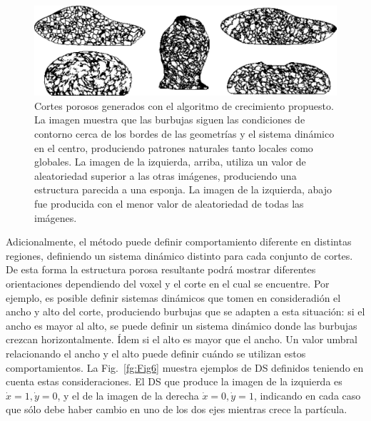 
\begin{figure}
  \centerline{\includegraphics[width=15cm]{figures/Fig5}}
  \caption{Cortes porosos generados con el algoritmo de crecimiento propuesto. La imagen muestra que las burbujas siguen las condiciones de contorno cerca de los bordes de las geometrías y el sistema dinámico en el centro, produciendo patrones naturales tanto locales como globales. La imagen de la izquierda, arriba, utiliza un valor de aleatoriedad superior a las otras imágenes, produciendo una estructura parecida a una esponja. La imagen de la izquierda, abajo fue producida con el menor valor de aleatoriedad de todas las imágenes.}
  \label{fg:Fig5}
\end{figure}

Adicionalmente, el método puede definir comportamiento diferente en distintas regiones, definiendo un sistema dinámico distinto para cada conjunto de cortes.
De esta forma la estructura porosa resultante podrá mostrar diferentes orientaciones dependiendo del voxel y el corte en el cual se encuentre.
Por ejemplo, es posible definir sistemas dinámicos que tomen en consideradión el ancho y alto del corte, produciendo burbujas que se adapten a esta situación: si el ancho es mayor al alto, se puede definir un sistema dinámico donde las burbujas crezcan horizontalmente.
Ídem si el alto es mayor que el ancho.
Un valor umbral relacionando el ancho y el alto puede definir cuándo se utilizan estos comportamientos.
La Fig.~\ref{fg:Fig6} muestra ejemplos de DS definidos teniendo en cuenta estas consideraciones.
El DS que produce la imagen de la izquierda es $\dot{x} = 1, \dot{y} = 0$, y el de la imagen de la derecha $\dot{x} = 0, \dot{y} = 1$, indicando en cada caso que sólo debe haber cambio en uno de los dos ejes mientras crece la partícula.

